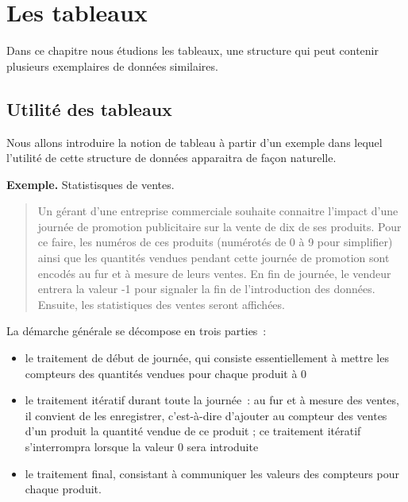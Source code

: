 \chapter{Les tableaux}

	Dans ce chapitre nous étudions les tableaux, 
	une structure qui peut contenir 
	plusieurs exemplaires de données similaires.

	\section{Utilité des tableaux}
	
		Nous allons introduire la notion de tableau à partir d’un exemple 
		dans lequel l’utilité de cette structure de données 
		apparaitra de façon naturelle.
	
		\textbf{Exemple.}
		Statistisques de ventes.
		\begin{quote}	
			Un gérant d’une entreprise commerciale 
			souhaite connaitre l’impact 
			d’une journée de promotion publicitaire 
			sur la vente de dix de ses produits.
			Pour ce faire, les numéros de ces produits 
			(numérotés de 0 à 9 pour simplifier) 
			ainsi que les quantités vendues 
			pendant cette journée de promotion 
			sont encodés au fur et à mesure de leurs ventes. 
			En fin de journée, 
			le vendeur entrera la valeur -1 
			pour signaler la fin de l’introduction des données. 
			Ensuite, les statistiques des ventes seront affichées.
		\end{quote}
	
		La démarche générale se décompose en trois parties~:
		\begin{itemize}
		\item
			le traitement de début de journée, qui consiste essentiellement à mettre
			les compteurs des quantités vendues pour chaque produit à 0
		\item
			le traitement itératif durant toute la journée~: 
			au fur et à mesure des ventes, 
			il convient de les enregistrer, 
			c’est-à-dire d’ajouter au compteur des ventes d’un produit 
			la quantité vendue de ce produit ; 
			ce traitement itératif s’interrompra lorsque la valeur 0 sera introduite
		\item
			le traitement final, consistant à communiquer les valeurs des compteurs
			pour chaque produit.
		\end{itemize}
	
